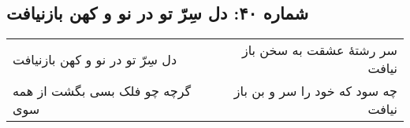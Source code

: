 \begin{center}
\section*{شماره ۴۰: دل سِرّ تو در نو و کهن بازنیافت}
\label{sec:040}
\begin{longtable}{l p{0.5cm} r}
دل سِرّ تو در نو و کهن بازنیافت
&&
سر رشتهٔ عشقت به سخن باز نیافت
\\
گرچه چو فلک بسی بگشت از همه سوی
&&
چه سود که خود را سر و بن باز نیافت
\\
\end{longtable}
\end{center}
